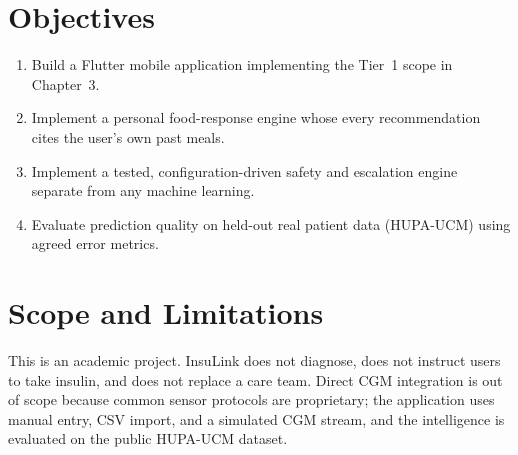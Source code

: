 \section{Objectives}
\begin{enumerate}
  \item Build a Flutter mobile application implementing the Tier~1 scope in Chapter~3.
  \item Implement a personal food-response engine whose every recommendation cites the user's own past meals.
  \item Implement a tested, configuration-driven safety and escalation engine separate from any machine learning.
  \item Evaluate prediction quality on held-out real patient data (HUPA-UCM) using agreed error metrics.
\end{enumerate}

\section{Scope and Limitations}
This is an academic project. InsuLink does not diagnose, does not instruct users to take insulin, and does not replace a care team. Direct CGM integration is out of scope because common sensor protocols are proprietary; the application uses manual entry, CSV import, and a simulated CGM stream, and the intelligence is evaluated on the public HUPA-UCM dataset.
